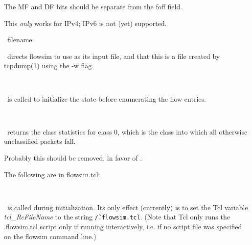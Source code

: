\documentclass{article}
\begin{document}
\BUGS

The MF and DF bits should be separate from the foff field.

This \emph{only} works for IPv4; IPv6 is not (yet) supported.

\manend

\label{sec:fsim_set_tcpd_file}

\SYNOPSIS \cmdname\ filename

\DESCRIPTION

\cmdname\ directs flowsim to use  as
its input file, and that this is a file created by tcpdump(1) using the
-w flag.

\SEEALSO


\manend

\label{sec:fsim_start_enumeration}

\SYNOPSIS \cmdname\

\DESCRIPTION

\cmdname\ is called to initialize the state before enumerating the flow
entries.

\SEEALSO


\manend

\label{sec:fsim_summary}

\SYNOPSIS \cmdname\

\DESCRIPTION

\cmdname\ returns the class statistics for class 0, which is the class
into which all otherwise unclassified packets fall.

\BUGS

Probably this should be removed, in favor of
.

\SEEALSO


\manend

The following are in flowsim.tcl:

\label{sec:fsim_startup}

\SYNOPSIS \cmdname\

\DESCRIPTION

\cmdname\ is called during initialization.  Its only effect (currently)
is to set the Tcl variable \emph{tcl\_RcFileName} to the string
\texttt{\~/.flowsim.tcl}.  (Note that Tcl only
runs the .flowsim.tcl script only if running interactively, i.e.
if no script file was specified on the flowsim command line.)
\end{document}
